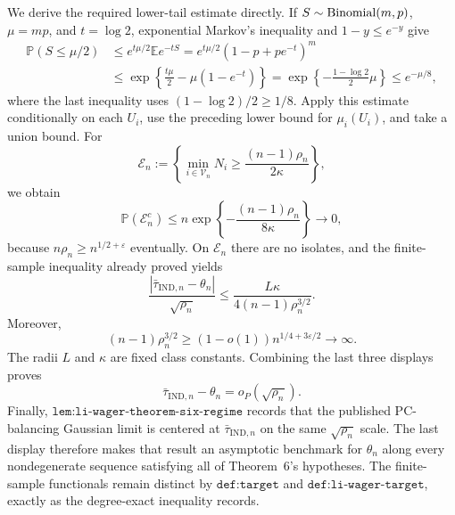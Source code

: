 We derive the required lower-tail estimate directly.  If \(S\sim{\rm Binomial}(m,p)\), \(\mu=mp\), and \(t=\log2\), exponential Markov's inequality and \(1-y\le e^{-y}\) give
\[
\begin{aligned}
\mathbb P(S\le\mu/2)
&\le e^{t\mu/2}\mathbb E e^{-tS}
=e^{t\mu/2}(1-p+pe^{-t})^m\\
&\le\exp\!\left\{\frac{t\mu}{2}-\mu(1-e^{-t})\right\}
=\exp\!\left\{-\frac{1-\log2}{2}\mu\right\}
\le e^{-\mu/8},
\end{aligned}
\]
where the last inequality uses \((1-\log2)/2\ge1/8\).  Apply this estimate conditionally on each \(U_i\), use the preceding lower bound for \(\mu_i(U_i)\), and take a union bound.  For
\[
\mathcal E_n
:=\left\{\min_{i\in\mathcal V_n}N_i\ge\frac{(n-1)\rho_n}{2\kappa}\right\},
\]
we obtain
\[
\mathbb P(\mathcal E_n^c)
\le n\exp\!\left\{-\frac{(n-1)\rho_n}{8\kappa}\right\}
\longrightarrow0,
\]
because \(n\rho_n\ge n^{1/2+\varepsilon}\) eventually.  On \(\mathcal E_n\) there are no isolates, and the finite-sample inequality already proved yields
\[
\frac{|\bar\tau_{\mathrm{IND},n}-\theta_n|}{\sqrt{\rho_n}}
\le\frac{L\kappa}{4(n-1)\rho_n^{3/2}}.
\]
Moreover,
\[
(n-1)\rho_n^{3/2}
\ge(1-o(1))n^{1/4+3\varepsilon/2}
\longrightarrow\infty.
\]
The radii \(L\) and \(\kappa\) are fixed class constants.  Combining the last three displays proves
\[
\bar\tau_{\mathrm{IND},n}-\theta_n=o_P(\sqrt{\rho_n}).
\]
Finally, \(\texttt{lem:li-wager-theorem-six-regime}\) records that the published PC-balancing Gaussian limit is centered at \(\bar\tau_{\mathrm{IND},n}\) on the same \(\sqrt{\rho_n}\) scale.  The last display therefore makes that result an asymptotic benchmark for \(\theta_n\) along every nondegenerate sequence satisfying all of Theorem~6's hypotheses.  The finite-sample functionals remain distinct by \(\texttt{def:target}\) and \(\texttt{def:li-wager-target}\), exactly as the degree-exact inequality records.